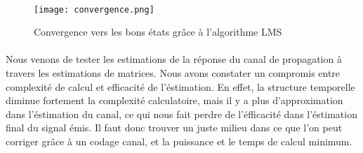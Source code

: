 \paragraph{}
\vspace{1\baselineskip}
\begin{figure}[!h]
  \centering
  \texttt{[image: convergence.png]}
  \caption{Convergence vers les bons états grâce à l'algorithme LMS }
	\label{convergence} 
\end{figure}
\paragraph{}
Nous venons de tester les estimations de la réponse du canal de propagation à travers les estimations de matrices. Nous avons constater un compromis entre complexité de calcul et efficacité de l'éstimation. En effet, la structure temporelle diminue fortement la complexité calculatoire, mais il y a plus d'approximation dans l'éstimation du canal, ce qui nous fait perdre de l'éfficacité dans l'éstimation final du signal émis. Il faut donc trouver un juste milieu dans ce que l'on peut corriger grâce à un codage canal, et la puissance et le temps de calcul minimum.



